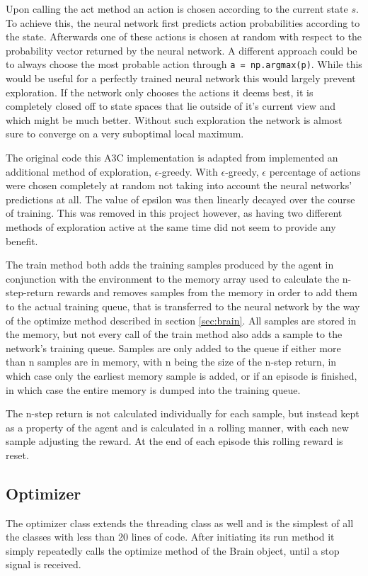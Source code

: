Upon calling the act method an action is chosen according to the current state $s$.
To achieve this, the neural network first predicts action probabilities according to the state. Afterwards one of these actions is chosen at random with respect to the probability vector returned by the neural network. A different approach could be to always choose the most probable action through
\lstinline{a = np.argmax(p)}. While this would be useful for a perfectly trained neural network this would largely prevent exploration. If the network only chooses the actions it deems best, it is completely closed off to state spaces that lie outside of it's current view and which might be much better. Without such exploration the network is almost sure to converge on a very suboptimal local maximum.

The original code this A3C implementation is adapted from implemented an additional method of exploration, $\epsilon$-greedy. With $\epsilon$-greedy, $\epsilon$ percentage of actions were chosen completely at random not taking into account the neural networks' predictions at all. The value of epsilon was then linearly decayed over the course of training. This was removed in this project however, as having two different methods of exploration active at the same time did not seem to provide any benefit.

The train method both adds the training samples produced by the agent in conjunction with the environment to the memory array used to calculate the n-step-return rewards and removes samples from the memory in order to add them to the actual training queue, that is transferred to the neural network by the way of the optimize method described in section \ref{sec:brain}. All samples are stored in the memory, but not every call of the train method also adds a sample to the network's training queue. Samples are only added to the queue if either more than n samples are in memory, with n being the size of the n-step return, in which case only the earliest memory sample is added, or if an episode is finished, in which case the entire memory is dumped into the training queue.

The n-step return is not calculated individually for each sample, but instead kept as a property of the agent and is calculated in a rolling manner, with each new sample adjusting the reward. At the end of each episode this rolling reward is reset. 

\subsection{Optimizer}
The optimizer class extends the threading class as well and is the simplest of all the classes with less than 20 lines of code. After initiating its run method it simply repeatedly calls the optimize method of the Brain object, until a stop signal is received.

